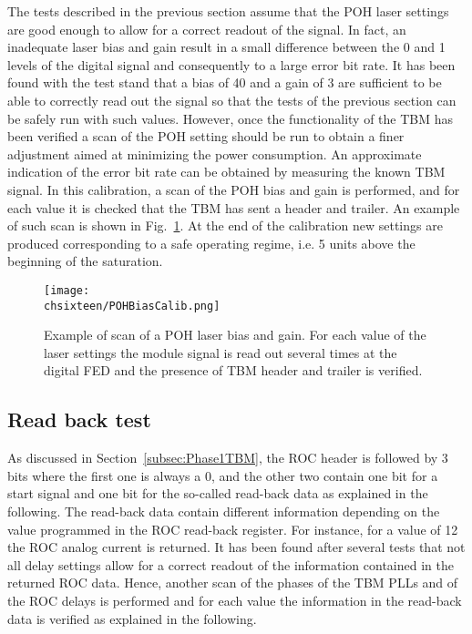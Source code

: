 The tests described in the previous section assume that the POH laser settings are good enough to allow for a correct readout of the signal.
In fact, an inadequate laser bias and gain result in a small difference between the 0 and 1 levels of the digital signal and consequently to a large error bit rate.
It has been found with the test stand that a bias of 40 and a gain of 3 are sufficient to be able to correctly read out the signal so that the tests of the previous section can be safely run with such values.
However, once the functionality of the TBM has been verified a scan of the POH setting should be run to obtain a finer adjustment aimed at minimizing the power consumption.
An approximate indication of the error bit rate can be obtained by measuring the known TBM signal.
In this calibration, a scan of the POH bias and gain is performed, and for each value it is checked that the TBM has sent a header and trailer. An example of such scan is shown in Fig.~\ref{fig:POHBiasCalib}.
At the end of the calibration new settings are produced corresponding to a safe operating regime, i.e. 5 units above the beginning of the saturation.

\begin{figure}[!htb]
 \begin{center}
  \texttt{[image: \\chsixteen/POHBiasCalib.png]}
 \end{center}
 \caption{Example of scan of a POH laser bias and gain. For each value of the laser settings the module signal is read out several times at the digital FED and the presence of TBM header and trailer is verified.}
 \label{fig:POHBiasCalib}
\end{figure} 

\subsection{Read back test}

As discussed in Section~\ref{subsec:Phase1TBM}, the ROC header is followed by 3 bits where the first one is always a 0,
and the other two contain one bit for a start signal and one bit for the so-called read-back data as explained in the following.
The read-back data contain different information depending on the value programmed in the ROC read-back register. For instance, for a value of 12 the ROC analog current is returned.
It has been found after several tests that not all delay settings allow for a correct readout of the information contained in the returned ROC data.
Hence, another scan of the phases of the TBM PLLs and of the ROC delays is performed and for each value the information in the read-back data is verified as explained in the following.


